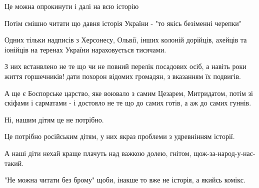 Це можна опрокинути і далі на всю історію 

Потім смішно читати що давня історія України - "то якісь безіменні черепки"

Одних тільки надписів з Херсонесу, Ольвії, інших колоній дорійців, ахейців та
іонійців на теренах України нараховується тисячами. 

З них встанвлено не те що чи не повний перелік посадових осіб, а навіть роки
життя горшечників! дати похорон відомих громадян, з вказанням їх подвигів. 

А ще є Боспорське царство, яке воювало з самим Цезарем, Митридатом, потім зі
скіфами і сарматами - і достояло не те що до самих готів, а аж до самих гуннів. 

Ні, нашим дітям це не потрібно. 

Це потрібно російським дітям, у них якраз проблеми з удревнінням історії. 

А наші діти нехай краще плачуть над важкою долею, гнітом, щож-за-народ-у-нас-такий. 

"Не можна читати без брому" щоби, інакше то вже не історія, а якийсь комікс.
